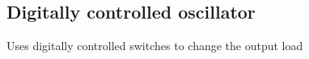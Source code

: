 \subsection*{Digitally controlled oscillator}
Uses digitally controlled switches to change the output load